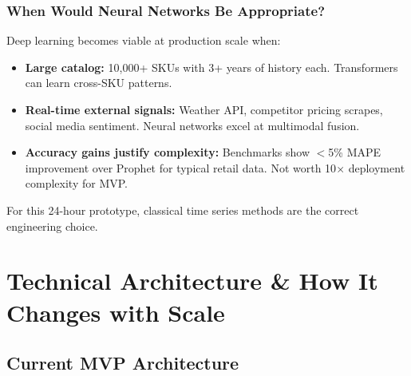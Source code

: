 \documentclass[11pt, a4paper]{article}
\begin{document}
\subsubsection{When Would Neural Networks Be Appropriate?}

Deep learning becomes viable at production scale when:
\begin{itemize}[leftmargin=1.5em]
    \item \textbf{Large catalog:} 10,000+ SKUs with 3+ years of history each. Transformers can learn cross-SKU patterns.
    \item \textbf{Real-time external signals:} Weather API, competitor pricing scrapes, social media sentiment. Neural networks excel at multimodal fusion.
    \item \textbf{Accuracy gains justify complexity:} Benchmarks show $<$5\% MAPE improvement over Prophet for typical retail data. Not worth 10$\times$ deployment complexity for MVP.
\end{itemize}

For this 24-hour prototype, classical time series methods are the correct engineering choice.


\section{Technical Architecture \& How It Changes with Scale}

\vspace{1.5em}

\subsection{Current MVP Architecture}
\end{document}

